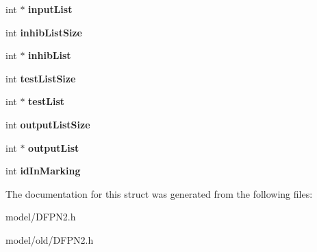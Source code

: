 \begin{DoxyCompactItemize}
\item 
\hypertarget{structTransition_ab4c4ecebe3b1a381fe834a0543e4a81a}{int $\ast$ {\bfseries input\-List}}\label{structTransition_ab4c4ecebe3b1a381fe834a0543e4a81a}

\item 
\hypertarget{structTransition_ac7a21bce5fa13011d32df0a5a83a8279}{int {\bfseries inhib\-List\-Size}}\label{structTransition_ac7a21bce5fa13011d32df0a5a83a8279}

\item 
\hypertarget{structTransition_a7b5491e031e904ab608a2450d2d785e9}{int $\ast$ {\bfseries inhib\-List}}\label{structTransition_a7b5491e031e904ab608a2450d2d785e9}

\item 
\hypertarget{structTransition_ab18bdec22309f4a74e4499f88c94d6f6}{int {\bfseries test\-List\-Size}}\label{structTransition_ab18bdec22309f4a74e4499f88c94d6f6}

\item 
\hypertarget{structTransition_a17f4f93d59ca57cbbba758e0361b9708}{int $\ast$ {\bfseries test\-List}}\label{structTransition_a17f4f93d59ca57cbbba758e0361b9708}

\item 
\hypertarget{structTransition_a5431eaaddb162ecec9af6f4a5a150417}{int {\bfseries output\-List\-Size}}\label{structTransition_a5431eaaddb162ecec9af6f4a5a150417}

\item 
\hypertarget{structTransition_ad38a3bc17b3ef9aecad0cf5df42c9155}{int $\ast$ {\bfseries output\-List}}\label{structTransition_ad38a3bc17b3ef9aecad0cf5df42c9155}

\item 
\hypertarget{structTransition_a890829881d0442a6f258f55bef2a1470}{int {\bfseries id\-In\-Marking}}\label{structTransition_a890829881d0442a6f258f55bef2a1470}

\end{DoxyCompactItemize}


The documentation for this struct was generated from the following files\-:\begin{DoxyCompactItemize}
\item 
model/D\-F\-P\-N2.\-h\item 
model/old/D\-F\-P\-N2.\-h\end{DoxyCompactItemize}
